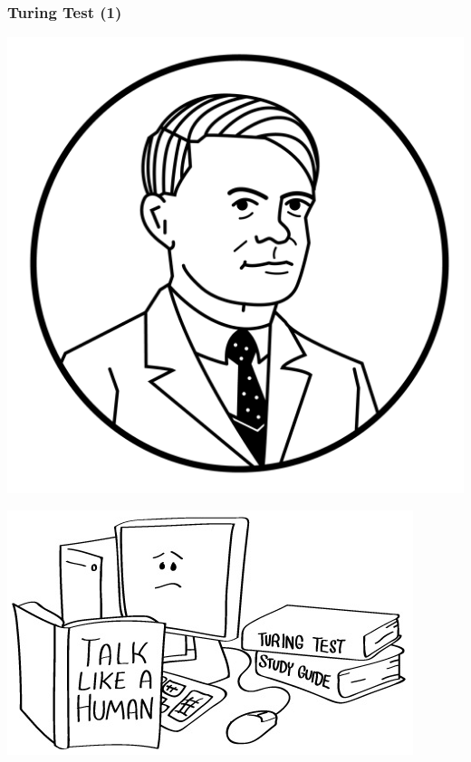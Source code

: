 \documentclass[aspectratio=43,x11names]{beamer}
\begin{document}
\begin{frame}[fragile]
\frametitle{Turing Test (1)}

\begin{minipage}{0.45\textwidth}
\begin{center}
\includegraphics[width=\textwidth, keepaspectratio]{images/turing} 
\end{center}
\end{minipage}
\begin{minipage}{0.45\textwidth}
\begin{center}
\includegraphics[width=\textwidth, keepaspectratio]{images/talkLikeAHuman} 
\end{center}
\end{minipage}
\end{frame}
\end{document}
